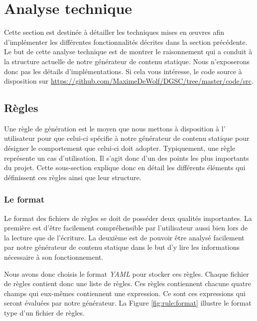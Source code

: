 \section{Analyse technique}
	Cette section est destinée à détailler les techniques mises en œuvres afin d'implémenter les différentes fonctionnalités décrites dans la section précédente. Le but de cette analyse technique est de montrer le raisonnement qui a conduit à la structure actuelle de notre générateur de contenu statique. Nous n'exposerons donc pas les détails d'implémentations. Si cela vous intéresse, le code source à disposition sur \url{https://github.com/MaximeDeWolf/DGSC/tree/master/code/src}.
	
	\subsection{Règles}
	
	Une règle de génération est le moyen que nous mettons à disposition à l' utilisateur pour que celui-ci spécifie à notre générateur de contenu statique pour désigner le comportement que celui-ci doit adopter.
	Typiquement, une règle représente un cas d'utilisation. Il s'agit donc d'un des points les plus importants du projet. Cette sous-section explique donc en détail les différents éléments qui définissent ces règles ainsi que leur structure.
	
	\subsubsection*{Le format}
	
		Le format des fichiers de règles se doit de posséder deux qualités importantes. La première est d'être facilement compréhensible par l'utilisateur aussi bien lors de la lecture que de l'écriture. La deuxième est de pouvoir être analysé facilement par notre générateur de contenu statique dans le but d'y lire les informations nécessaire à son fonctionnement.
		
		Nous avons donc choisis le format \textit{YAML} pour stocker ces règles. Chaque fichier de règles contient donc une liste de règles. Ces règles contiennent chacune quatre champs qui eux-mêmes contiennent une expression. Ce sont ces expressions qui seront évaluées par notre générateur. La Figure \ref{fig:rule:format} illustre le format type d'un fichier de règles.
		
